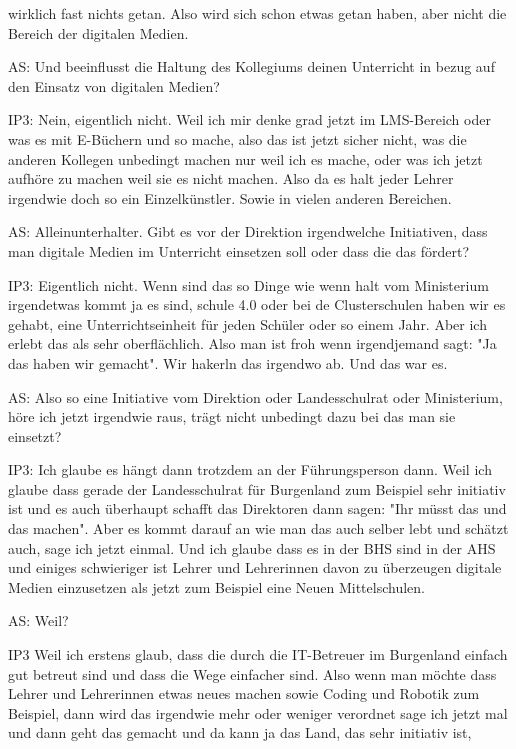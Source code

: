 \documentclass[fontsize=11pt,paper=a4]{scrbook}
\begin{document}
{\begin{itemize*}
wirklich fast nichts getan.
Also wird sich schon etwas getan haben, aber
nicht die Bereich der digitalen Medien.
\item[AS:] Und beeinflusst die Haltung des
Kollegiums deinen Unterricht in bezug
auf den Einsatz von digitalen Medien?
\item[IP3:] Nein, eigentlich nicht. Weil ich mir denke grad
jetzt im LMS-Bereich oder was es mit E-Büchern und so mache,  also das ist jetzt sicher
nicht, was die anderen Kollegen unbedingt
machen nur weil ich es mache,  oder was ich
jetzt aufhöre zu machen weil sie es nicht
machen.
Also da es halt jeder Lehrer irgendwie
doch so ein Einzelkünstler. Sowie in
vielen anderen Bereichen.
\item[AS:] Alleinunterhalter. Gibt es vor der
Direktion irgendwelche Initiativen, dass man
digitale Medien im Unterricht einsetzen
soll oder dass die das fördert?
\item[IP3:] Eigentlich nicht. Wenn sind das so Dinge
wie wenn halt vom Ministerium
irgendetwas kommt ja es sind,  schule 4.0
oder bei de Clusterschulen haben wir es gehabt, eine Unterrichtseinheit für jeden
Schüler oder so einem Jahr.
Aber ich erlebt das als sehr
oberflächlich. Also man ist froh wenn
irgendjemand sagt: "Ja das haben wir
gemacht". Wir hakerln das irgendwo ab. Und das war es.
\item[AS:] Also so eine Initiative vom Direktion oder Landesschulrat oder Ministerium, höre ich jetzt irgendwie
raus, trägt nicht unbedingt dazu bei das
man sie einsetzt?
\item[IP3:] Ich glaube es hängt dann
trotzdem an der Führungsperson dann.
Weil ich glaube dass gerade der Landesschulrat für Burgenland zum Beispiel
sehr initiativ ist und es auch überhaupt
schafft das Direktoren dann sagen: "Ihr
müsst das und das machen". Aber es kommt
darauf an wie man das auch selber lebt
und schätzt auch, sage ich jetzt einmal. Und ich glaube dass es in
der BHS sind in der AHS und einiges
schwieriger ist Lehrer und Lehrerinnen
davon zu überzeugen digitale Medien
einzusetzen als jetzt zum Beispiel eine Neuen
Mittelschulen.
\item[AS:] Weil?
\item[IP3] Weil ich erstens glaub,
dass die durch die IT-Betreuer im Burgenland einfach gut betreut sind und dass die Wege
einfacher sind. Also wenn man möchte dass
Lehrer und Lehrerinnen etwas neues
machen sowie Coding und Robotik zum
Beispiel, dann wird das irgendwie mehr
oder weniger verordnet sage ich jetzt
mal und dann geht das gemacht und da
kann ja das Land, das sehr initiativ ist,

\end{itemize*}}
\end{document}
